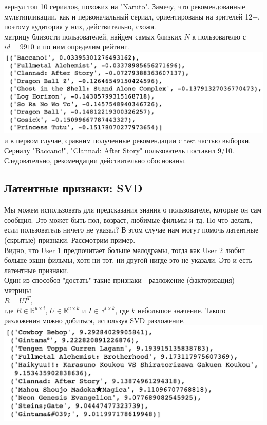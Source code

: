 \documentclass{article}
\newcommand\tab[1][1cm]{\hspace*{#1}}
\begin{document}
 вернул топ 10 сериалов, похожих на "Naruto". Замечу, что рекомендованные мультипликации, как и первоначальный сериал, ориентированы на зрителей 12+, поэтому аудитория у них, действительно, схожа.\\
 матрицу близости пользователей, найдем самых близких $N$ к пользователю с $id=9910$ и по ним определим рейтинг.
\tab\includegraphics[scale=0.8]{f17.png}\\
 и в первом случае, сравним полученные рекомендации с test частью выборки. Сериалу "Baccano!", "Clannad: After Story" пользователь поставил 9/10. Следовательно, рекомендации действительно обоснованы.\\
\subsection{Латентные признаки: SVD}
Мы можем использовать для предсказания знания о пользователе, которые он сам сообщил. Это может быть пол, возраст, любимые фильмы и тд. Но что делать, если пользователь ничего не указал? В этом случае нам могут помочь латентные (скрытые) признаки. Рассмотрим пример.\\
Видно, что User 1 предпочитает больше мелодрамы, тогда как User 2 любит больше экшн фильмы, хотя ни тот, ни другой нигде это не указали. Это и есть латентные признаки.\\
Один из способов "достать" такие признаки - разложение (факторизация) матрицы\\
$R=UI^T,$\\
где $R\in\mathbb{R}^{u\times{}i}$, $U\in\mathbb{R}^{u\times{}k}$ и $I\in\mathbb{R}^{i\times{}k}$, где $k$ небольшое значение. Такого разложения можно добиться, используя SVD разложение.\\
\includegraphics[scale=0.8]{f18.png}\\
\newpage
{}
\end{document}

